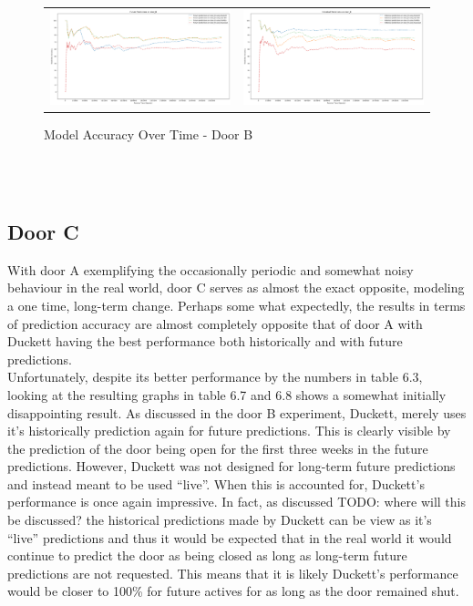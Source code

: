 \begin{figure}
  \begin{tabular}{cc}
    {\includegraphics[width = 3in]{images/results/Future_Predictions_on_door_B.png}} &
    {\includegraphics[width = 3in]{images/results/Historical_Predictions_on_door_B.png}} \\
  \end{tabular}
  \caption{Model Accuracy Over Time - Door B}
\end{figure}\\ \\



\subsection { Door C }

With door A exemplifying the occasionally periodic and somewhat noisy
behaviour in the real world, door C serves as almost the exact opposite,
modeling a one time, long-term change.
Perhaps some what expectedly, the results in terms of prediction accuracy are
almost completely opposite that of door A with Duckett having the best
performance both historically and with future predictions. \\

Unfortunately, despite its better performance by the numbers in table 6.3,
looking at the resulting graphs in table 6.7 and 6.8 shows a somewhat
initially disappointing result. As discussed in the door B experiment,
Duckett, merely uses it's historically prediction again for future
predictions. This is clearly visible by the prediction of the door being open
for the first three weeks in the future predictions.  However, Duckett was not
designed for long-term future predictions and instead meant to be used
``live''. When this is accounted for, Duckett's performance is once again
impressive.  In fact, as discussed TODO: where will this be discussed? the
historical predictions made by Duckett can be view as it's ``live''
predictions and thus it would be expected that in the real world it would
continue to predict the door as being closed as long as long-term future
predictions are not requested. This means that it is likely Duckett's
performance would be closer to 100\% for future actives for as long as the door
remained shut. \\

